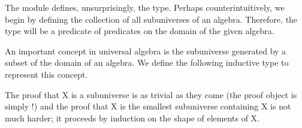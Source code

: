 \documentclass[a4paper,UKenglish,cleveref,autoref,thm-restate]{lipics-v2021}
\begin{document}
The \ualibSubuniverses module defines, unsurprisingly, the  type. Perhaps counterintuitively, we begin by defining the collection of all subuniverses of an algebra. Therefore, the type will be a predicate of predicates on the domain of the given algebra.
\ccpad
\begin{code}
  
\end{code}
\ccpad
An important concept in universal algebra is the subuniverse generated by a subset of the domain of an algebra.  We define the following inductive type to represent this concept.
\ccpad
\begin{code}
  
\end{code}
\ccpad
The proof that  \ab X is a subuniverse is as trivial as they come (the proof object is simply 
!)
and the proof that  \ab X is the smallest subuniverse containing \ab X is not much harder; it proceeds by induction on the shape of elements of  \ab X.
\end{document}
